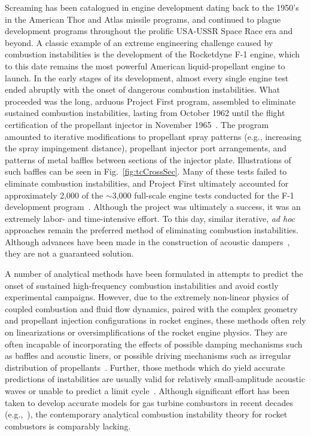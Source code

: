 Screaming has been catalogued in engine development dating back to the 1950's in the American Thor and Atlas missile programs, and continued to plague development programs throughout the prolific USA-USSR Space Race era and beyond. A classic example of an extreme engineering challenge caused by combustion instabilities is the development of the Rocketdyne F-1 engine, which to this date remains the most powerful American liquid-propellant engine to launch. In the early stages of its development, almost every single engine test ended abruptly with the onset of dangerous combustion instabilities. What proceeded was the long, arduous Project First program, assembled to eliminate sustained combustion instabilities, lasting from October 1962 until the flight certification of the propellant injector in November 1965~\cite{Young2008}. The program amounted to iterative modifications to propellant spray patterns (e.g., increasing the spray impingement distance), propellant injector port arrangements, and patterns of metal baffles between sections of the injector plate. Illustrations of such baffles can be seen in Fig.~\ref{fig:tcCrossSec}. Many of these tests failed to eliminate combustion instabilities, and Project First ultimately accounted for approximately 2,000 of the $\sim$3,000 full-scale engine tests conducted for the F-1 development program~\cite{Oefelein1993}. Although the project was ultimately a success, it was an extremely labor- and time-intensive effort. To this day, similar iterative, \textit{ad hoc} approaches remain the preferred method of eliminating combustion instabilities. Although advances have been made in the construction of acoustic dampers~\cite{Zhao2015}, they are not a guaranteed solution.

A number of analytical methods have been formulated in attempts to predict the onset of sustained high-frequency combustion instabilities and avoid costly experimental campaigns. However, due to the extremely non-linear physics of coupled combustion and fluid flow dynamics, paired with the complex geometry and propellant injection configurations in rocket engines, these methods often rely on linearizations or oversimplifications of the rocket engine physics. They are often incapable of incorporating the effects of possible damping mechanisms such as baffles and acoustic liners, or possible driving mechanisms such as irregular distribution of propellants~\cite{Yang1995}. Further, those methods which do yield accurate predictions of instabilities are usually valid for relatively small-amplitude acoustic waves or unable to predict a limit cycle~\cite{Culick1994}. Although significant effort has been taken to develop accurate models for gas turbine combustors in recent decades (e.g.,~\cite{Noiray2008}), the contemporary analytical combustion instability theory for rocket combustors is comparably lacking.

